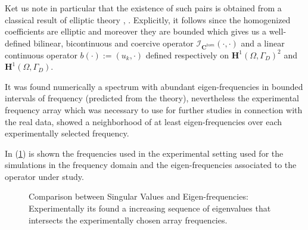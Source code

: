 \begin{rem}
Ket us note in particular that the existence of such pairs is obtained from a classical result of elliptic theory \cite{raviart1983introduction}, \cite{evans2010partial}. Explicitly, it follows since the homogenized coefficients are elliptic and moreover they are bounded which gives us a well-defined bilinear, bicontinuous and coercive operator $\mathcal{I}_{\mathbf{C}^{hom}}(\cdot, \cdot)$ and a linear continuous operator $b(\cdot) := (u_k, \cdot)$ defined respectively on $\mathbf{H}^1(\Omega, \Gamma_D)^2$ and $\mathbf{H}^1(\Omega, \Gamma_D)$.
\end{rem}



It was found numerically a spectrum with abundant eigen-frequencies in bounded intervals of frequency (predicted from the theory), nevertheless the experimental frequency array which was necessary to use for further studies in connection with the real data, showed a neighborhood of at least eigen-frequencies over each experimentally selected frequency. 

In (\ref{EigenValuesComparison}) is shown the frequencies used in the experimental setting used for the simulations in the frequency domain and the eigen-frequencies associated to the operator under study.

\begin{figure}%
    \centering
    \qquad
    \caption{Comparison between Singular Values and Eigen-frequencies: Experimentally its found a increasing sequence of eigenvalues that intersects the experimentally chosen array frequencies.}%
    \label{EigenValuesComparison}%
\end{figure}


